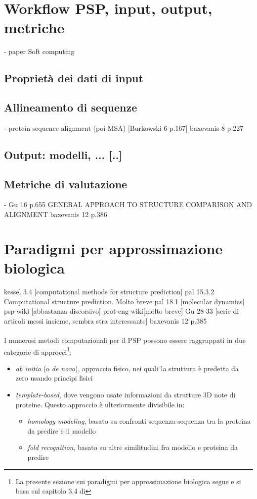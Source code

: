 \section{Workflow PSP, input, output, metriche}
- paper Soft computing
\subsection{Proprietà dei dati di input}
\subsection{Allineamento di sequenze}
- protein sequence alignment (poi MSA)
[Burkowski 6 p.167]
baxevanis 8 p.227


\subsection{Output: modelli, ... [..]}
\subsection{Metriche di valutazione}
- Gu 16 p.655 GENERAL APPROACH TO STRUCTURE COMPARISON AND ALIGNMENT
baxevanis 12 p.386

\section{Paradigmi per approssimazione biologica}
kessel 3.4 [computational methods for structure prediction]
pal 15.3.2 Computational structure prediction. Molto breve
pal 18.1 [molecular dynamics]
psp-wiki [abbastanza discorsivo]
prot-eng-wiki[molto breve]
Gu 28-33 [serie di articoli messi insieme, sembra stra interessante]
baxevanis 12 p.385 \\ \\


I numerosi metodi computazionali per il PSP possono essere raggruppati in due categorie di approcci\footnote{La presente sezione sui paradigmi per approssimazione biologica segue e si basa sul capitolo 3.4 di }:
\begin{itemize}
	\item \textit{ab initio} (o \textit{de novo}), approccio fisico, nei quali la struttura è predetta da zero usando principi fisici
	\item \textit{template-based}, dove vengono usate informazioni da strutture 3D note di proteine. Questo approccio è ulteriormente divisibile in:
	\begin{itemize}
		\item \textit{homology modeling}, basato su confronti sequenza-sequenza tra la proteina da predire e il modello
	\item \textit{fold recognition}, basato su altre similitudini fra modello e proteina da predire
	\end{itemize}
\end{itemize}

